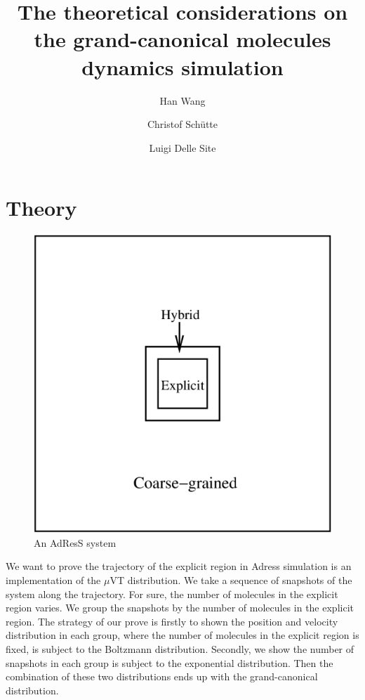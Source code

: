 \documentclass[aps,pre,preprint,unsortedaddress]{revtex4}
\begin{document}
\title{The theoretical considerations on the grand-canonical molecules dynamics simulation}
\author{Han Wang}
\author{Christof Sch\"utte}
\author{Luigi Delle Site}

\begin{abstract}
\end{abstract}

\maketitle

\section{Theory}


\begin{figure}
  \centering
  \includegraphics[width=.5\textwidth]{fig/system/system.eps}
  \caption{An AdResS system}
  \label{fig:tmp1}
\end{figure}


We want to prove the trajectory of the explicit region in Adress
simulation is an implementation of the $\mu$VT distribution. We take a
sequence of snapshots of the system along the trajectory.  For sure,
the number of molecules in the explicit region varies. We group the
snapshots by the number of molecules in the explicit region.  The
strategy of our prove is firstly to shown the position and
velocity distribution in each group, where the number of molecules
in the explicit region is fixed, is subject to the Boltzmann
distribution. Secondly, we show the number of snapshots in each group
is subject to the exponential distribution. Then the combination of
these two distributions ends up with the grand-canonical distribution.
\end{document}
